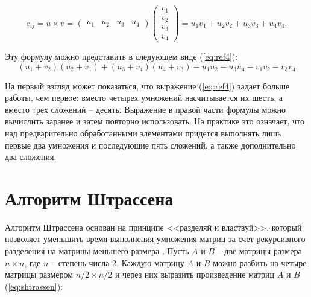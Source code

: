 \begin{equation}
	c_{ij} = \overline{u} \times \overline{v} =
	\begin{pmatrix} u_{1} & u_{2} & u_{3} & u_{4}\end{pmatrix}
	\begin{pmatrix} v_{1} \\ v_{2} \\ v_{3} \\ v_{4}\end{pmatrix} =
	u_{1}v_{1} + u_{2}v_{2} + u_{3}v_{3} + u_{4}v_{4}.
	\label{eq:ref3}
\end{equation}

Эту формулу можно представить в следующем виде (\ref{eq:ref4}):
\begin{equation}
	(u_{1}+v_{2})(u_{2}+v_{1}) + (u_{3}+v_{4})(u_{4}+v_{3}) - u_{1}u_{2} - u_{3}u_{4} - v_{1}v_{2} - v_{3}v_{4}
	\label{eq:ref4}
\end{equation}

На первый взгляд  может показаться, что выражение (\ref{eq:ref4}) задает больше работы, чем первое: вместо четырех умножений насчитывается их шесть, а вместо трех сложений -- десять. Выражение в правой части формулы  можно вычислить заранее и затем повторно использовать. На практике это означает, что над предварительно обработанными элементами придется выполнять лишь первые два умножения и последующие пять сложений, а также дополнительно два сложения.

\section{Алгоритм Штрассена}
Алгоритм Штрассена основан на принципе <<разделяй и властвуй>>, который позволяет уменьшить время выполнения умножения матриц за счет рекурсивного разделения на матрицы меньшего размера \cite{shtrassen}. Пусть $A$ и $B$ -- две матрицы размера $n \times n$, где $n$ -- степень числа 2. Каждую матрицу $A$ и $B$ можно разбить на четыре матрицы размером $n/2 \times n/2$ и через них выразить произведение матриц $A$ и $B$ (\ref{eq:shtrassen}):

